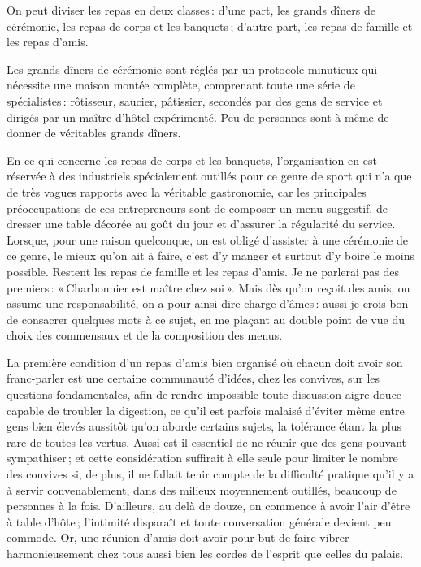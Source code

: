 
On peut diviser les repas en deux classes : d'une part, les grands dîners de
cérémonie, les repas de corps et les banquets ; d'autre part, les repas de
famille et les repas d'amis.

Les grands dîners de cérémonie sont réglés par un protocole minutieux qui
nécessite une maison montée complète, comprenant toute une série de
spécialistes : rôtisseur, saucier, pâtissier, secondés par des gens de service
et dirigés par un maître d'hôtel expérimenté. Peu de personnes sont à même de
donner de véritables grands dîners.

En ce qui concerne les repas de corps et les banquets, l'organisation en est
réservée à des industriels spécialement outillés pour ce genre de sport qui n'a
que de très vagues rapports avec la véritable gastronomie, car les principales
préoccupations de ces entrepreneurs sont de composer un menu suggestif, de
dresser une table décorée au goût du jour et d'assurer la régularité du
service. Lorsque, pour une raison quelconque, on est obligé d'assister à une
cérémonie de ce genre, le mieux qu'on ait à faire, c'est d'y manger et surtout
d'y boire le moins possible. Restent les repas de famille et les repas d'amis.
Je ne parlerai pas des premiers : « Charbonnier est maître chez soi ». Mais dès
qu'on reçoit des amis, on assume une responsabilité, on a pour ainsi dire
charge d'âmes : aussi je crois bon de consacrer quelques mots à ce sujet, en me
plaçant au double point de vue du choix des commensaux et de la composition des
menus.

La première condition d'un repas d'amis bien organisé où chacun doit avoir son
franc-parler est une certaine communauté d'idées, chez les convives, sur les
questions fondamentales, afin de rendre impossible toute discussion aigre-douce
capable de troubler la digestion, ce qu'il est parfois malaisé d'éviter même
entre gens bien élevés aussitôt qu'on aborde certains sujets, la tolérance
étant la plus rare de toutes les vertus. Aussi est-il essentiel de ne réunir
que des gens pouvant sympathiser ; et cette considération suffirait à elle
seule pour limiter le nombre des convives si, de plus, il ne fallait tenir
compte de la difficulté pratique qu'il y a à servir convenablement, dans des
milieux moyennement outillés, beaucoup de personnes à la fois. D'ailleurs, au
delà de douze, on commence à avoir l'air d’être à table d'hôte ; l'intimité
disparaît et toute conversation générale devient peu commode. Or, une réunion
d'amis doit avoir pour but de faire vibrer harmonieusement chez tous aussi bien
les cordes de l'esprit que celles du palais.

